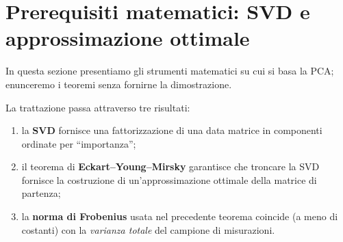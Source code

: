 \documentclass[11pt,a4paper]{article}
\theoremstyle{plain}
\theoremstyle{definition}
\theoremstyle{remark}
\begin{document}


\section{Prerequisiti matematici: SVD e approssimazione ottimale}

In questa sezione presentiamo gli strumenti matematici su cui si basa la PCA;
enunceremo i teoremi senza fornirne la dimostrazione. \newline



La trattazione passa attraverso tre risultati:
\begin{enumerate}
  \item la \textbf{SVD} fornisce una fattorizzazione di una data matrice in componenti ordinate
        per ``importanza'';
  \item il teorema di \textbf{Eckart--Young--Mirsky} garantisce che troncare
      la SVD fornisce la costruzione di un'approssimazione ottimale
      della matrice di partenza;
  \item la \textbf{norma di Frobenius} usata nel precedente teorema coincide
        (a meno di costanti) con la \emph{varianza totale} del campione di misurazioni.
\end{enumerate}

\medskip
\end{document}
